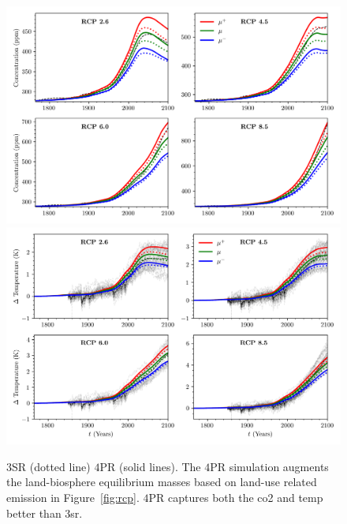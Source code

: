 \documentclass[11pt, a4paper, pdftex, twoside, dvipsnames]{article}
\renewcommand{\ref}{\cref}
\begin{document}
 
 





 \begin{figure}[b]
	\includegraphics[width=\textwidth]{fig/simulations_rcp_conc_base_both_x}
	\includegraphics[width=\textwidth]{fig/simulations_rcp_temp_base_both_x}
	\caption{
$3$SR (dotted line) $4$PR (solid lines). The $4$PR simulation augments the land-biosphere equilibrium masses based on land-use related emission in Figure~\ref{fig:rcp}. $4$PR captures both the co2 and temp better than 3sr. 
     }
    \label{fig:6222}
\end{figure}
%


 
 
\end{document}

